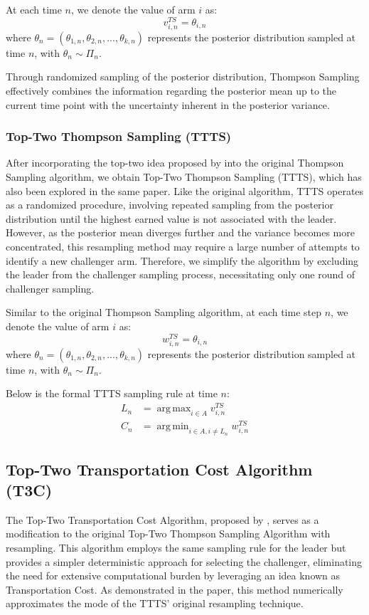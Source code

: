 \documentclass[a4paper, 12pt]{article}
\DeclareMathOperator{\argmax}{arg\,max}
\DeclareMathOperator{\argmin}{arg\,min}
\theoremstyle{definition}
\begin{document}
At each time $n$, we denote the value of arm $i$ as:
\[
v_{i,n}^{TS} = \theta_{i,n}   
\]
where $\theta_n = (\theta_{1,n},\theta_{2,n}, ..., \theta_{k,n})$ represents the posterior distribution sampled at time $n$, with $\theta_{n}\sim \Pi_n$.

Through randomized sampling of the posterior distribution, Thompson Sampling effectively combines the information regarding the posterior mean up to the current time point with the uncertainty inherent in the posterior variance.

\subsubsection{Top-Two Thompson Sampling (TTTS)}
After incorporating the top-two idea proposed by \cite{toptwo} into the original Thompson Sampling algorithm, we obtain Top-Two Thompson Sampling (TTTS), which has also been explored in the same paper. Like the original algorithm, TTTS operates as a randomized procedure, involving repeated sampling from the posterior distribution until the highest earned value is not associated with the leader. However, as the posterior mean diverges further and the variance becomes more concentrated, this resampling method may require a large number of attempts to identify a new challenger arm. Therefore, we simplify the algorithm by excluding the leader from the challenger sampling process, necessitating only one round of challenger sampling.

Similar to the original Thompson Sampling algorithm, at each time step $n$, we denote the value of arm $i$ as:
\[
w_{i,n}^{TS} = \theta_{i,n}   
\]
where $\theta_n = (\theta_{1,n},\theta_{2,n}, ..., \theta_{k,n})$ represents the posterior distribution sampled at time $n$, with $\theta_{n}\sim \Pi_n$.

Below is the formal TTTS sampling rule at time $n$:
\begin{align} \label{eq:ttts}
L_n & = \argmax_{i\in A} v_{i,n}^{TS} \nonumber \\
C_n & = \argmin_{i\in A,i\neq L_n} w_{i,n}^{TS}
\end{align}


\subsection{Top-Two Transportation Cost Algorithm (T3C)}
The Top-Two Transportation Cost Algorithm, proposed by \cite{ttucb2}, serves as a modification to the original Top-Two Thompson Sampling Algorithm with resampling. This algorithm employs the same sampling rule for the leader but provides a simpler deterministic approach for selecting the challenger, eliminating the need for extensive computational burden by leveraging an idea known as Transportation Cost. As demonstrated in the paper, this method numerically approximates the mode of the TTTS' original resampling technique.
\end{document}

